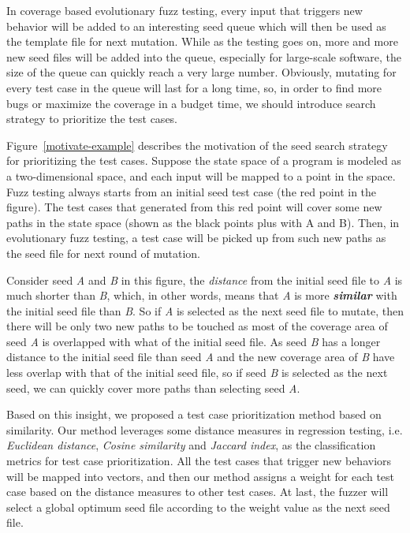 In coverage based evolutionary fuzz testing, every input that triggers new behavior will be added to an interesting seed queue which will then be used as the template file for next mutation. While as the testing goes on, more and more new seed files will be added into the queue, especially for large-scale software, the size of the queue can quickly reach a very large number. Obviously, mutating for every test case in the queue will last for a long time, so, in order to find more bugs or maximize the coverage in a budget time, we should introduce search strategy to prioritize the test cases. 

Figure~\ref{motivate-example} describes the motivation of the seed search strategy for prioritizing the test cases. Suppose the state space of a program is modeled as a two-dimensional space, and each input will be mapped to a point in the space. Fuzz testing always starts from an initial seed test case (the red point in the figure). The test cases that generated from this red point will cover some new paths in the state space (shown as the black points plus with A and B). Then, in evolutionary fuzz testing, a test case will be picked up from such new paths as the seed file for next round of mutation. 

Consider seed \textit{A} and \textit{B} in this figure, the \emph{distance} from the initial seed file to \textit{A} is much shorter than \textit{B}, which, in other words, means that \textit{A} is more \textbf{\textit{similar}} with the initial seed file than \textit{B}. So if \textit{A} is selected as the next seed file to mutate, then there will be only two new paths to be touched as most of the coverage area of seed \textit{A} is overlapped with what of the initial seed file. As seed \textit{B} has a longer distance to the initial seed file than seed \textit{A} and the new coverage area of \textit{B} have less overlap with that of the initial seed file, so if seed \textit{B} is selected as the next seed, we can quickly cover more paths than selecting seed \textit{A}.

Based on this insight, we proposed a test case prioritization method based on similarity. Our method leverages some distance measures in regression testing, i.e. \textit{Euclidean distance}, \textit{Cosine similarity} and \textit{Jaccard index}, as the classification metrics for test case prioritization. All the test cases that trigger new behaviors will be mapped into vectors, and then our method assigns a weight for each test case based on the distance measures to other test cases. At last, the fuzzer will select a global optimum seed file according to the weight value as the next seed file.

